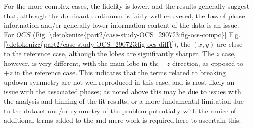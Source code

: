 \documentclass[letterpaper,table,10pt,english]{jupyterBook}
\begin{document}
\sphinxAtStartPar
For the more complex cases, the fidelity is lower, and the results generally suggest that, although the dominant continuum is fairly well recovered, the loss of phase information and/or generally lower information content of the data is an issue. For \(OCS\) (\hyperref[\detokenize{part2/case-study-OCS_290723:fig-ocs-compc}]{Fig.\@ \ref{\detokenize{part2/case-study-OCS_290723:fig-ocs-compc}}} \sphinxhyphen{} \hyperref[\detokenize{part2/case-study-OCS_290723:fig-ocs-diff}]{Fig.\@ \ref{\detokenize{part2/case-study-OCS_290723:fig-ocs-diff}}}), the \((x,y)\) {\hyperref[\detokenize{backmatter/glossary:term-MF}]{}} are close to the reference case, although the lobes are significantly sharper. The \(z\) case, however, is very different, with the main lobe in the \(-z\) direction, as opposed to \(+z\) in the reference case. This indicates that the terms related to breaking up\sphinxhyphen{}down symmetry are not well reproduced in this case, and is most likely an issue with the associated phases; as noted above this may be due to issues with the analysis and binning of the fit results, or a more fundamental limitation due to the dataset and/or symmetry of the problem \sphinxhyphen{} potentially with the choice of additional terms added to the {\hyperref[\detokenize{backmatter/glossary:term-ADMs}]{}} \sphinxhyphen{} and more work is required here to ascertain this.
\end{document}
